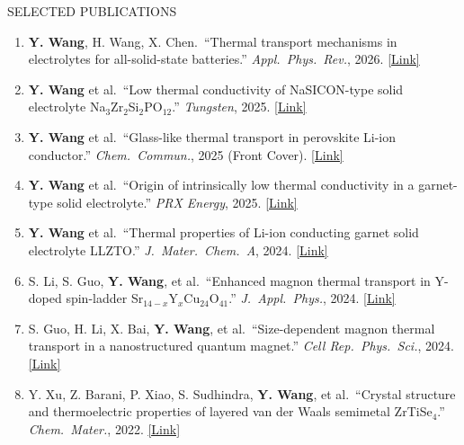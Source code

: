 \documentclass{resume}
\begin{document}
\begin{rSection}{SELECTED PUBLICATIONS}
\begin{enumerate}
\itemsep 0.05em
\item \textbf{Y. Wang}, H. Wang, X. Chen.\ ``Thermal transport mechanisms in electrolytes for all-solid-state batteries.'' \textit{Appl.\ Phys.\ Rev.}, 2026. \href{https://doi.org/10.1063/5.0318328}{[Link]}
\item \textbf{Y. Wang} et al.\ ``Low thermal conductivity of NaSICON-type solid electrolyte Na$_3$Zr$_2$Si$_2$PO$_{12}$.'' \textit{Tungsten}, 2025. \href{https://doi.org/10.1007/s42864-025-00357-6}{[Link]}
\item \textbf{Y. Wang} et al.\ ``Glass-like thermal transport in perovskite Li-ion conductor.'' \textit{Chem.\ Commun.}, 2025 (Front Cover). \href{https://doi.org/10.1039/D5CC04693A}{[Link]}
\item \textbf{Y. Wang} et al.\ ``Origin of intrinsically low thermal conductivity in a garnet-type solid electrolyte.'' \textit{PRX Energy}, 2025. \href{https://doi.org/10.1103/6wj2-kzhh}{[Link]}
\item \textbf{Y. Wang} et al.\ ``Thermal properties of Li-ion conducting garnet solid electrolyte LLZTO.'' \textit{J.\ Mater.\ Chem.\ A}, 2024. \href{https://doi.org/10.1039/D4TA02264E}{[Link]}
\item S. Li, S. Guo, \textbf{Y. Wang}, et al.\ ``Enhanced magnon thermal transport in Y-doped spin-ladder Sr$_{14-x}$Y$_x$Cu$_{24}$O$_{41}$.'' \textit{J.\ Appl.\ Phys.}, 2024. \href{https://doi.org/10.1063/5.0214897}{[Link]}
\item S. Guo, H. Li, X. Bai, \textbf{Y. Wang}, et al.\ ``Size-dependent magnon thermal transport in a nanostructured quantum magnet.'' \textit{Cell Rep.\ Phys.\ Sci.}, 2024. \href{https://doi.org/10.1016/j.xcrp.2024.101879}{[Link]}
\item Y. Xu, Z. Barani, P. Xiao, S. Sudhindra, \textbf{Y. Wang}, et al.\ ``Crystal structure and thermoelectric properties of layered van der Waals semimetal ZrTiSe$_4$.'' \textit{Chem.\ Mater.}, 2022. \href{https://doi.org/10.1021/acs.chemmater.2c02155}{[Link]}
\end{enumerate}
\end{rSection}

\end{document}
